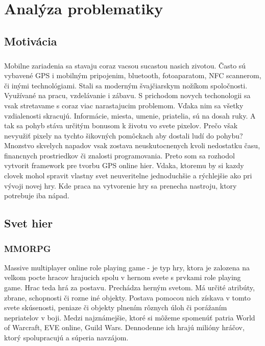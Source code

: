 \chapter{Analýza problematiky}
\section{Motivácia}
\paragraph{}
Mobilne zariadenia sa stavaju coraz vacsou sucastou nasich zivotou. Často sú vybavené GPS i mobilným pripojenim, bluetooth, fotoaparatom, NFC scannerom, či inými technológiami. Stali sa moderným švajčiarskym nožíkom spoločnosti. Využívané na pracu, vzdelávanie i zábavu. S prichodom novych techonologii sa vsak stretavame s coraz viac narastajucim problemom. Vďaka nim sa všetky vzdialenosti skracujú. Informácie, miesta, umenie, priatelia, sú na dosah ruky. A tak sa pohyb stáva určitým bonusom k životu vo svete pixelov. Prečo však nevyužiť pixely na tychto šikovných pomôckach aby dostali ludí do pohybu?\\
Mnozstvo skvelych napadov vsak zostava neuskutocnenych kvoli nedostatku času, financnych prostriedkov či znalosti programovania. Preto som sa rozhodol vytvorit framework pre tvorbu GPS online hier. Vdaka, ktoremu by si kazdy clovek mohol spravit vlastny svet neuveritelne jednoduchšie a rýchlejšie ako pri vývoji novej hry. Kde praca na vytvorenie hry sa prenecha nastroju, ktory potrebuje iba nápad.

\section{Svet hier}
\subsection{MMORPG}
Massive multiplayer online role playing game - je typ hry, ktora je zalozena na velkom pocte hracov hrajucich spolu v hernom svete s prvkami role playing game. Hrac teda hrá za postavu. Prechádza herným svetom. Má určité atribúty, zbrane, schopnosti či rozne iné objekty. Postava pomocou nich získava v tomto svete skúsenosti, peniaze či objekty plnením rôznych úloh či porážaním nepriatelov v boji. 
Medzi najznámejšie, ktoré si môžeme spomenúť patria World of Warcraft, EVE online, Guild Wars. Dennodenne ich hrajú milióny hráčov, ktorý spolupracujú a súperia navzájom.

